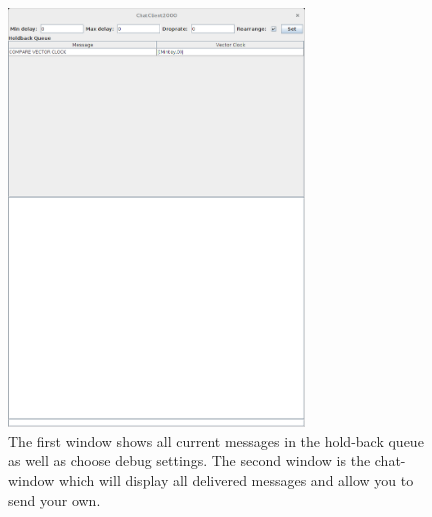 \begin{figure}[h!]
\centering
\includegraphics[width=0.7\textwidth]{Pictures/debugAndChat}
\caption{The first window shows all current messages in the hold-back queue as well as choose debug settings. The second window is the chat-window which will display all delivered messages and allow you to send your own. }
\end{figure}

\pagebreak
